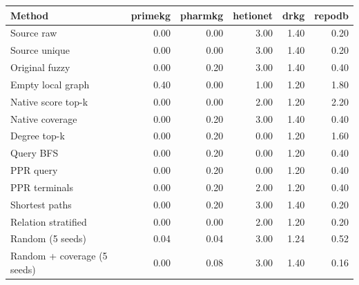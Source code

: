 \begin{tabular}{lrrrrr}
\hline
Method & primekg & pharmkg & hetionet & drkg & repodb \\
\hline
Source raw & 0.00 & 0.00 & 3.00 & 1.40 & 0.20 \\
Source unique & 0.00 & 0.00 & 3.00 & 1.40 & 0.20 \\
Original fuzzy & 0.00 & 0.20 & 3.00 & 1.40 & 0.40 \\
Empty local graph & 0.40 & 0.00 & 1.00 & 1.20 & 1.80 \\
Native score top-k & 0.00 & 0.00 & 2.00 & 1.20 & 2.20 \\
Native coverage & 0.00 & 0.20 & 3.00 & 1.40 & 0.40 \\
Degree top-k & 0.00 & 0.20 & 0.00 & 1.20 & 1.60 \\
Query BFS & 0.00 & 0.20 & 0.00 & 1.20 & 0.40 \\
PPR query & 0.00 & 0.20 & 0.00 & 1.20 & 0.40 \\
PPR terminals & 0.00 & 0.20 & 2.00 & 1.20 & 0.40 \\
Shortest paths & 0.00 & 0.20 & 3.00 & 1.40 & 0.20 \\
Relation stratified & 0.00 & 0.00 & 2.00 & 1.20 & 0.20 \\
Random (5 seeds) & 0.04 & 0.04 & 3.00 & 1.24 & 0.52 \\
Random + coverage (5 seeds) & 0.00 & 0.08 & 3.00 & 1.40 & 0.16 \\
\hline
\end{tabular}